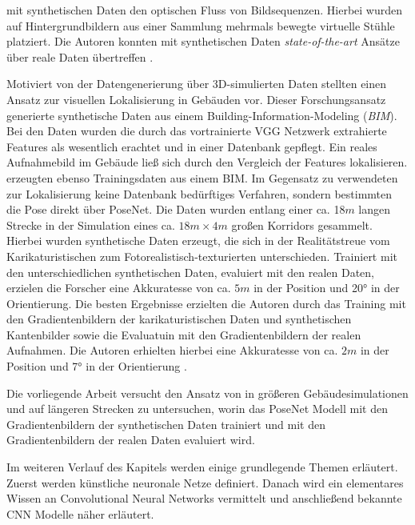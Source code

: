 mit synthetischen Daten den optischen Fluss von Bildsequenzen. Hierbei wurden auf Hintergrundbildern aus einer Sammlung mehrmals bewegte virtuelle Stühle platziert. Die Autoren konnten mit synthetischen Daten \textit{state-of-the-art} Ansätze über reale Daten übertreffen \cite{dosovitskiyFlowNetLearningOptical2015}.

Motiviert von der Datengenerierung über 3D-simulierten Daten stellten \citet{haImagebasedIndoorLocalization2018} einen Ansatz zur visuellen Lokalisierung in Gebäuden vor. Dieser Forschungsansatz generierte synthetische Daten aus einem Building-Information-Modeling (\textit{BIM}). Bei den Daten wurden die durch das vortrainierte VGG Netzwerk \cite{simonyanVeryDeepConvolutional2014} extrahierte Features als wesentlich erachtet und in einer Datenbank gepflegt. Ein reales Aufnahmebild im Gebäude ließ sich durch den Vergleich der Features lokalisieren. \citet{acharyaBIMPoseNetIndoorCamera2019} erzeugten ebenso Trainingsdaten aus einem BIM. Im Gegensatz zu \citet{haImagebasedIndoorLocalization2018} verwendeten \citet{acharyaBIMPoseNetIndoorCamera2019} zur Lokalisierung keine Datenbank bedürftiges Verfahren, sondern bestimmten die Pose direkt über PoseNet. Die Daten wurden entlang einer ca. 18$m$ langen Strecke in der Simulation eines ca. $18m \times 4m$ großen Korridors gesammelt. Hierbei wurden synthetische Daten erzeugt, die sich in der Realitätstreue vom Karikaturistischen zum Fotorealistisch-texturierten unterschieden. Trainiert mit den unterschiedlichen synthetischen Daten, evaluiert mit den realen Daten, erzielen die Forscher eine Akkuratesse von ca. $5m$ in der Position und 20° in der Orientierung.
Die besten Ergebnisse erzielten die Autoren durch das Training mit den Gradientenbildern der karikaturistischen Daten und synthetischen Kantenbilder sowie die Evaluatuin mit den Gradientenbildern der realen Aufnahmen. Die Autoren erhielten hierbei eine Akkuratesse von ca. $2m$ in der Position und 7° in der Orientierung \cite{acharyaBIMPoseNetIndoorCamera2019}.

Die vorliegende Arbeit versucht den Ansatz von \citet{acharyaBIMPoseNetIndoorCamera2019} in größeren Gebäudesimulationen und auf längeren Strecken  zu untersuchen, worin das PoseNet Modell mit den Gradientenbildern der synthetischen Daten trainiert und mit den Gradientenbildern der realen Daten evaluiert wird.

Im weiteren Verlauf des Kapitels werden einige grundlegende Themen erläutert. Zuerst werden künstliche neuronale Netze definiert. Danach wird ein elementares Wissen an Convolutional Neural Networks vermittelt und anschließend bekannte CNN Modelle näher erläutert.

